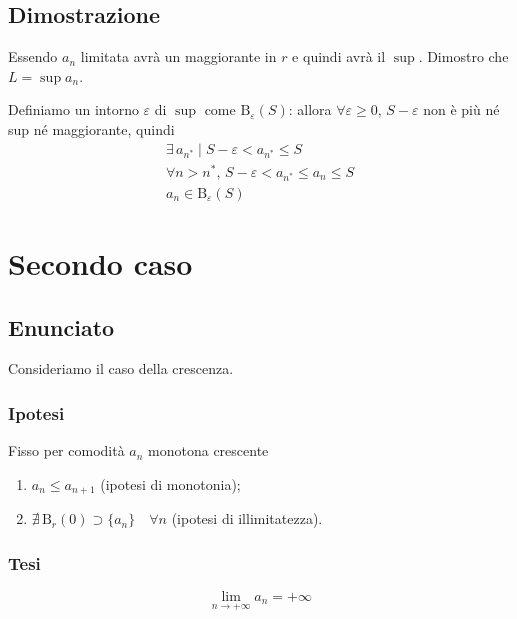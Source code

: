 \documentclass[../../dimostrazioni]{subfiles}
\begin{document}
            \subsection*{Dimostrazione}
                Essendo \(a_n\) limitata avrà un maggiorante in \(r\) e quindi avrà il \(\sup\).
                Dimostro che \(L = \sup{a_n}\).

                Definiamo un intorno \(\varepsilon\) di \(\sup\) come \(\mathrm{B}_\varepsilon (S)\): allora
                \(\forall \varepsilon \geqslant 0, \, S-\varepsilon\) non è più né sup né maggiorante, quindi
                \begin{gather*}
                    \exists \, a_{n^*} \mid S-\varepsilon < a_{n^*} \leqslant S \\
                    \forall n > n^*, \, S-\varepsilon < a_{n^*} \leqslant a_n \leqslant S \\
                    a_n \in \mathrm{B}_\varepsilon(S) 
                \end{gather*}
                
        \newpage

        \section*{Secondo caso}

            \subsection*{Enunciato}

            Consideriamo il caso della crescenza.
                
            \subsubsection*{Ipotesi}
                 
            Fisso per comodità \(a_n\) monotona crescente

            \begin{enumerate}
               \indentitem \item \(a_n \leqslant a_{n+1}\) (ipotesi di monotonia);
               \indentitem \item \(\nexists \, \mathrm{B}_r(0) \supset \{a_n\} \quad \forall n \) (ipotesi di illimitatezza).
            \end{enumerate}
        
            \subsubsection*{Tesi}
                \[\lim_{n \to +\infty} a_n = +\infty\]
    
\end{document}

